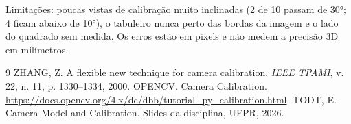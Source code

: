\documentclass[10pt,a4paper]{article}
\begin{document}
Limitações: poucas vistas de calibração muito inclinadas (2 de 10 passam de
30°; 4 ficam abaixo de 10°), o tabuleiro nunca perto das bordas da imagem e o
lado do quadrado sem medida. Os erros estão em pixels e não medem a precisão 3D
em milímetros.

\vspace{-6pt}
\begin{thebibliography}{9}\small
{} ZHANG, Z. A flexible new technique for camera calibration.
  \emph{IEEE TPAMI}, v. 22, n. 11, p. 1330--1334, 2000.
 OPENCV. Camera Calibration.
  \url{https://docs.opencv.org/4.x/dc/dbb/tutorial_py_calibration.html}.
 TODT, E. Camera Model and Calibration. Slides da disciplina,
  UFPR, 2026.
\end{thebibliography}
\end{document}
